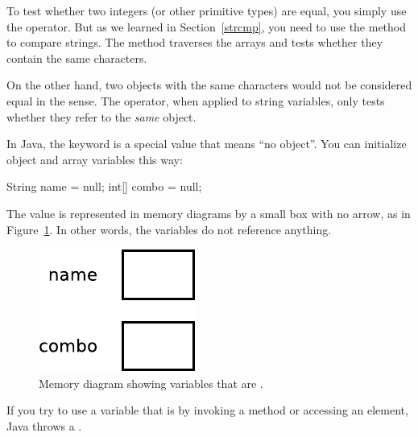 
To test whether two integers (or other primitive types) are equal, you simply use the \java{==} operator.
But as we learned in Section~\ref{strcmp}, you need to use the  method to compare strings.
The  method traverses the arrays and tests whether they contain the same characters.

On the other hand, two  objects with the same characters would not be considered equal in the \java{==} sense.
The \java{==} operator, when applied to string variables, only tests whether they refer to the {\em same} object.




In Java, the keyword  is a special value that means ``no object''.
You can initialize object and array variables this way:

\begin{code}
String name = null;
int[] combo = null;
\end{code}

The value  is represented in memory diagrams by a small box with no arrow, as in Figure~\ref{fig.mem4}.
In other words, the variables do not reference anything.

\begin{figure}[!ht]
\begin{center}
\includegraphics[scale=0.85]{figs/mem4.pdf}
\caption{Memory diagram showing variables that are .}
\label{fig.mem4}
\end{center}
\end{figure}


If you try to use a variable that is  by invoking a method or accessing an element, Java throws a .

